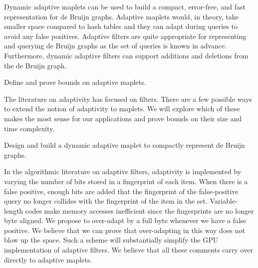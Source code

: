 Dynamic adaptive maplets can be used to build a compact, error-free, and fast representation for de Bruijn graphs. Adaptive maplets would, in theory, take smaller space compared to hash tables and they can adapt during queries to avoid any false positives. Adaptive filters are quite appropriate for representing and querying de Bruijn graphs as the set of queries is known in advance. Furthermore, dynamic adaptive filters can support \kmer additions and deletions from the de Bruijn graph.

\begin{rproblem}\label{rprob:adaptive-maplet}
Define and prove bounds on adaptive maplets.
\end{rproblem}
The literature on adaptivity has focused on filters.  There are a few possible ways to extend the notion of adaptivity to maplets.  We will explore which of these makes the most sense for our applications and prove bounds on their size and time complexity.

\begin{rproblem}\label{rprob:dyn-apt-filter}
Design and build a dynamic adaptive maplet to compactly represent de Bruijn graphs.
\end{rproblem}

In the algorithmic literature on adaptive filters, adaptivity is implemented by varying the number of bits stored in a fingerprint of each item.  When there is a false positive, enough bits are added that the fingerprint of the false-positive query no longer collides with the fingerprint of the item in the set.  Variable-length codes make memory accesses inefficient since the fingerprints are no longer byte aligned.  We propose to over-adapt by a full byte whenever we have a false positive.  We believe that we can prove that over-adapting in this way does not blow up the space.  Such a scheme will substantially simplify the GPU implementation of adaptive filters.  We believe that all these comments carry over directly to adaptive maplets.





